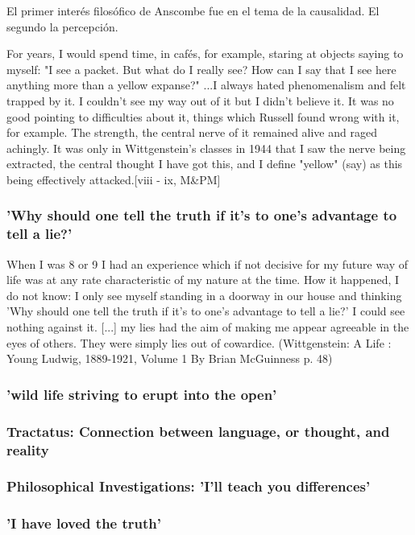 \documentclass[../main.tex]{subfiles}
\begin{document}
El primer interés filosófico de Anscombe fue en el tema de la causalidad.
El segundo la percepción.

For years, I would spend time, in cafés, for example, staring at objects saying to myself: "I see a packet. But what do I really see? How can I say that I see here anything more than a yellow expanse?" ...I always hated phenomenalism and felt trapped by it. I couldn't see my way out of it but I didn't believe it. It was no good pointing to difficulties about it, things which Russell found wrong with it, for example. The strength, the central nerve of it remained alive and raged achingly. It was only in Wittgenstein's classes in 1944 that I saw the nerve being extracted, the central thought I have got this, and I define "yellow" (say) as this being effectively attacked.[viii - ix, M\&PM]

\subsubsection{'Why should one tell the truth if it's to one's advantage to tell a lie?'}

When I was 8 or 9 I had an experience which if not decisive for my future way of life was at any rate characteristic of my nature at the time. How it happened, I do not know: I only see myself standing in a doorway in our house and thinking 'Why should one tell the truth if it's to one's advantage to tell a lie?' I could see nothing against it. [...] my lies had the aim of making me appear agreeable in the eyes of others. They were simply lies out of cowardice. (Wittgenstein: A Life : Young Ludwig, 1889-1921, Volume 1 By Brian McGuinness p. 48)

\subsubsection{'wild life striving to erupt into the open'}

\subsubsection{Tractatus: Connection between language, or thought, and reality}

\subsubsection{Philosophical Investigations: 'I'll teach you differences'}

\subsubsection{'I have loved the truth'}
\end{document}
